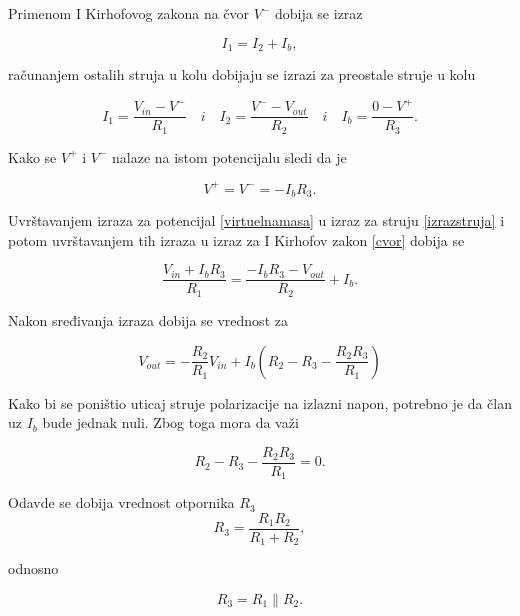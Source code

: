 {Primenom I Kirhofovog zakona na čvor $V^-$ dobija se izraz}

\begin{equation}
    I_1 = I_2 + I_b,
    \label{cvor}
\end{equation}

{računanjem ostalih struja u kolu dobijaju se izrazi za preostale struje u kolu}

\begin{equation}
    I_1 = \frac{V_{in} - V^-}{R_1} \quad i \quad I_2 = \frac{V^- - V_{out}}{R_2} \quad i \quad I_b = \frac{0 - V^+}{R_3}.
    \label{izrazstruja}
\end{equation}

{Kako se $V^+$ i $V^-$ nalaze na istom potencijalu sledi da je}

\begin{equation}
    V^+ = V^- = -I_bR_3.
    \label{virtuelnamasa}
\end{equation}

{Uvrštavanjem izraza za potencijal \ref{virtuelnamasa} u izraz za struju \ref{izrazstruja} i potom uvrštavanjem tih izraza u izraz za I Kirhofov zakon \ref{cvor} dobija se }

\begin{equation}
    \frac{V_{in} + I_bR_3}{R_1} = \frac{-I_bR_3 - V_{out}}{R_2} + I_b.
\end{equation}

{Nakon sređivanja izraza dobija se vrednost za}

\begin{equation}
    V_{out} = -\frac{R_2}{R_1}V_{in} + I_b(R_2 - R_3 -\frac{R_2R_3}{R_1})
\end{equation}

{Kako bi se poništio uticaj struje polarizacije na izlazni napon, potrebno je da član uz $I_b$ bude jednak nuli. Zbog toga mora da važi}

\begin{equation}
R_2-R_3-\frac{R_2R_3}{R_1}=0.
\end{equation}

{Odavde se dobija vrednost otpornika $R_3$
}
\begin{equation}
R_3=\frac{R_1R_2}{R_1+R_2},
\end{equation}

odnosno

\begin{equation}
    \boxed{R_3=R_1\parallel R_2}.
\end{equation}

